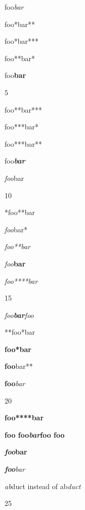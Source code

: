 foo\emph{bar}

foo*bar**

foo*bar***

foo**bar*

foo\textbf{bar}

5

foo**bar***

foo***bar*

foo***bar**

foo\textbf{\emph{bar}}

\emph{foo}bar

10

*foo**bar

\emph{foo}bar*

\emph{foo**bar}

\emph{foo}\textbf{bar}

\emph{foo****bar}

15

\emph{foo\textbf{bar}foo}

**foo*bar

\textbf{foo*bar}

\textbf{foo}bar**

\textbf{foo}\emph{bar}

20

\textbf{foo****bar}

\textbf{foo foo\emph{bar}foo foo}

\textbf{\emph{foo}bar}

\emph{\textbf{foo}bar}

\emph{ab}duct instead of ab\emph{duct}

25
